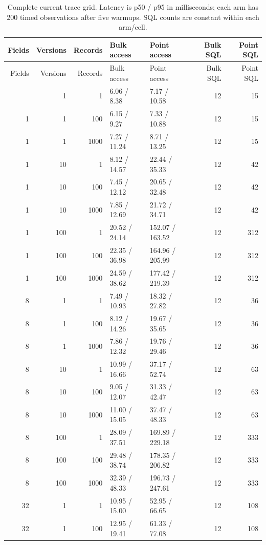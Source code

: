\documentclass[11pt,a4paper]{article}
\begin{document}
\begingroup
\small
\setlength{\tabcolsep}{3pt}
\begin{longtable}{@{}rrrllrr@{}}
\caption{Complete current trace grid. Latency is p50 / p95 in milliseconds; each arm has 200 timed observations after five warmups. SQL counts are constant within each arm/cell.}\label{tab:s-trace-grid}\\
\toprule
Fields & Versions & Records & Bulk access & Point access & Bulk SQL & Point SQL \\
\midrule
\endfirsthead
\toprule
Fields & Versions & Records & Bulk access & Point access & Bulk SQL & Point SQL \\
\midrule
\endhead
\bottomrule
\endfoot
1 & 1 & 1 & 6.06 / 8.38 & 7.17 / 10.58 & 12 & 15 \\
1 & 1 & 100 & 6.15 / 9.27 & 7.33 / 10.88 & 12 & 15 \\
1 & 1 & 1000 & 7.27 / 11.24 & 8.71 / 13.25 & 12 & 15 \\
1 & 10 & 1 & 8.12 / 14.57 & 22.44 / 35.33 & 12 & 42 \\
1 & 10 & 100 & 7.45 / 12.12 & 20.65 / 32.48 & 12 & 42 \\
1 & 10 & 1000 & 7.85 / 12.69 & 21.72 / 34.71 & 12 & 42 \\
1 & 100 & 1 & 20.52 / 24.14 & 152.07 / 163.52 & 12 & 312 \\
1 & 100 & 100 & 22.35 / 36.98 & 164.96 / 205.99 & 12 & 312 \\
1 & 100 & 1000 & 24.59 / 38.62 & 177.42 / 219.39 & 12 & 312 \\
8 & 1 & 1 & 7.49 / 10.93 & 18.32 / 27.82 & 12 & 36 \\
8 & 1 & 100 & 8.12 / 14.26 & 19.67 / 35.65 & 12 & 36 \\
8 & 1 & 1000 & 7.86 / 12.32 & 19.76 / 29.46 & 12 & 36 \\
8 & 10 & 1 & 10.99 / 16.66 & 37.17 / 52.74 & 12 & 63 \\
8 & 10 & 100 & 9.05 / 12.07 & 31.33 / 42.47 & 12 & 63 \\
8 & 10 & 1000 & 11.00 / 15.05 & 37.47 / 48.33 & 12 & 63 \\
8 & 100 & 1 & 28.09 / 37.51 & 169.89 / 229.18 & 12 & 333 \\
8 & 100 & 100 & 29.48 / 38.74 & 178.35 / 206.82 & 12 & 333 \\
8 & 100 & 1000 & 32.39 / 48.33 & 196.73 / 247.61 & 12 & 333 \\
32 & 1 & 1 & 10.95 / 15.00 & 52.95 / 66.65 & 12 & 108 \\
32 & 1 & 100 & 12.95 / 19.41 & 61.33 / 77.08 & 12 & 108 \\

\end{longtable}
\end{document}
